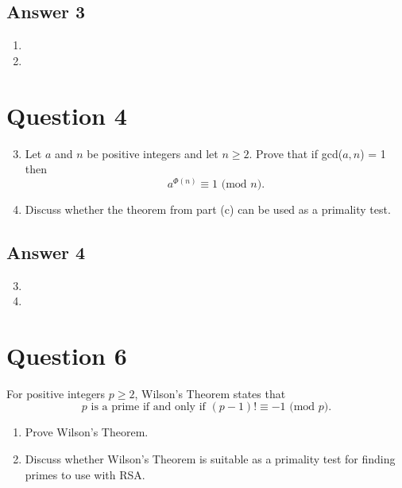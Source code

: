 \documentclass{article}
\begin{document}
	\subsection*{Answer 3}
	\renewcommand{\theenumi}{\alph{enumi}}
	\begin{enumerate}
		\item 
		
		\item 
	\end{enumerate}	
		

	
	\section*{Question 4}
	\renewcommand{\theenumi}{\alph{enumi}}
	\begin{enumerate}
		\setcounter{enumi}{2}
		\item Let $a$ and $n$ be positive integers and let $n  \ge 2$. Prove that if gcd($a, n$) = 1 then
		$$
		a^{\Phi(n)} \equiv 1 \text{ (mod $n$)}.
		$$
		
		\item Discuss whether the theorem from part (c) can be used as a primality test.
	\end{enumerate}	

	\subsection*{Answer 4}
	\renewcommand{\theenumi}{\alph{enumi}}
	\begin{enumerate}
		\setcounter{enumi}{2}
		\item 
		
		\item 
	\end{enumerate}	



	\section*{Question 6}
	For positive integers $p \ge 2$, Wilson’s Theorem states that 
	$$
	p \text{ is a prime if and only if } (p - 1)!  \equiv -1 \text{ (mod $p$).}
	$$
	\renewcommand{\theenumi}{\alph{enumi}}
	\begin{enumerate}
		\item Prove Wilson’s Theorem.
		
		\item Discuss whether Wilson’s Theorem is suitable as a primality test for finding	primes to use with RSA.
	\end{enumerate}	
\end{document}
